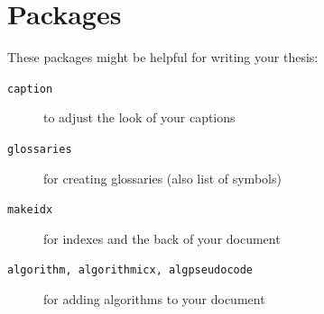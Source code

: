 \section{Packages}
These packages might be helpful for writing your thesis:

\begin{description}
	\item[\texttt{caption}] to adjust the look of your captions
	\item[\texttt{glossaries}] for creating glossaries (also list of symbols)
	\item[\texttt{makeidx}] for indexes and the back of your document
	\item[\texttt{algorithm, algorithmicx, algpseudocode}] for adding algorithms to your document
\end{description}
\fi